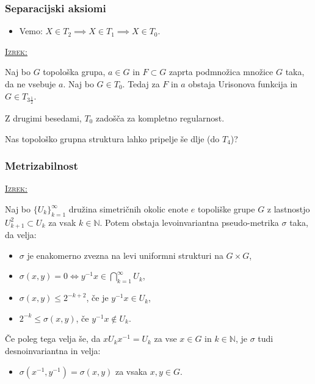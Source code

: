 \documentclass[a4paper, 12pt]{beamer}
\newenvironment{matematika}[1]{
\textcolor{bostonuniversityred}{\underline{\textsc{#1:}}}
}{
}
\begin{document}
\begin{frame}
\frametitle{Separacijski aksiomi}
\begin{itemize}[label=]
\item Vemo: $X \in T_2 \implies X \in T_1 \implies X \in T_0$.
\end{itemize}

\pause

\begin{matematika}{Izrek}
Naj bo $G$ topološka grupa, $a \in G$ in $F \subset G$ zaprta podmnožica množice $G$ taka, da ne vsebuje $a$. Naj bo $G \in T_0$. Tedaj za $F$ in $a$ obstaja Urisonova funkcija in $G \in T_{3 \frac{1}{2}}$.
\end{matematika}
\newline

\pause

Z drugimi besedami, $T_0$ zadošča za kompletno regularnost.
\newline

\pause

Nas topološko grupna struktura lahko pripelje še dlje (do $T_4$)?

\end{frame}

\begin{frame}
\frametitle{Metrizabilnost}
\begin{matematika}{Izrek}
Naj bo $\{ U_k \}_{k=1}^{\infty}$ družina simetričnih okolic enote $e$ topoliške grupe $G$ z lastnostjo $U_{k+1}^2 \subset U_k$ za vsak $k\in\mathbb{N}$. Potem obstaja levoinvariantna pseudo-metrika $\sigma$ taka, da velja:
\begin{itemize}[label=]
\item $\sigma$ je enakomerno zvezna na levi uniformni strukturi na $G \times G$,
\item $\sigma (x, y) = 0 \iff y^{-1}x \in \bigcap_{k=1}^{\infty}U_k$,
\item $\sigma (x, y) \leq 2^{-k+2}$, če je $y^{-1}x \in U_k$,
\item $2^{-k} \leq \sigma (x, y)$, če $y^{-1}x \notin U_k$.
\end{itemize}
Če poleg tega velja še, da $x U_k x^{-1} = U_k$ za vse $x \in G$ in $k\in\mathbb{N}$, je $\sigma$ tudi desnoinvariantna in velja:
\begin{itemize}[label=]
\item $\sigma (x^{-1}, y^{-1}) = \sigma (x, y)$ za vsaka $x, y \in G$.
\end{itemize}
\end{matematika}
\end{frame}
\end{document}
